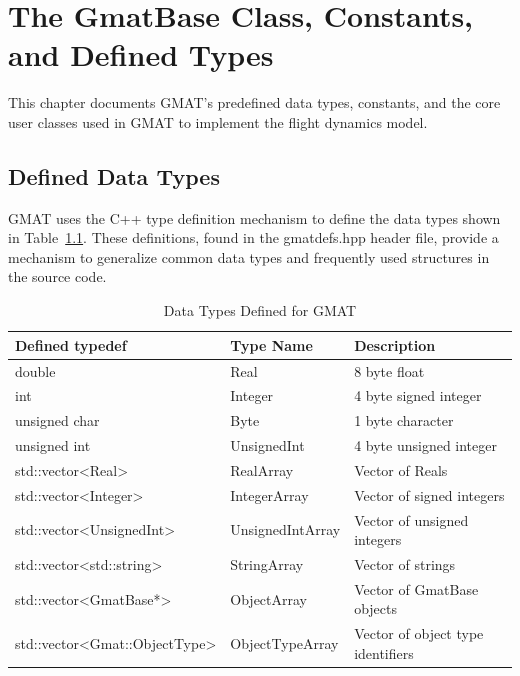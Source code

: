 \chapter{\label{chapter:CoreClasses}The GmatBase Class, Constants, and Defined Types}

This chapter documents GMAT's predefined data types, constants, and the core user classes used in
GMAT to implement the flight dynamics model.

\section{Defined Data Types}

GMAT uses the C++ type definition mechanism to define the data types shown in
Table~\ref{table:GmatDataTypes}.  These definitions, found in the gmatdefs.hpp header file, provide
a mechanism to generalize common data types and frequently used structures in the source code.

\begin{table}[H]
\begin{center}
\caption{\label{table:GmatDataTypes}Data Types Defined for GMAT}
\setlength\extrarowheight{2pt}
\begin{tabular}{|p{2in}|p{1.2in}|p{2.5in}|}
\hline
Defined typedef & Type Name & Description \\
\hline
\hline
double & Real & 8 byte float\\
int & Integer & 4 byte signed integer\\
unsigned char & Byte & 1 byte character\\
unsigned int & UnsignedInt & 4 byte unsigned integer\\
std::vector<Real> & RealArray & Vector of Reals\\
std::vector<Integer> & IntegerArray & Vector of signed integers\\
std::vector<UnsignedInt> & UnsignedIntArray & Vector of unsigned integers\\
std::vector<std::string> & StringArray & Vector of strings\\
std::vector<GmatBase*> & ObjectArray & Vector of GmatBase objects\\
std::vector<Gmat::ObjectType> & ObjectTypeArray & Vector of object type identifiers\\
\hline
\end{tabular}
\end{center}
\end{table}

